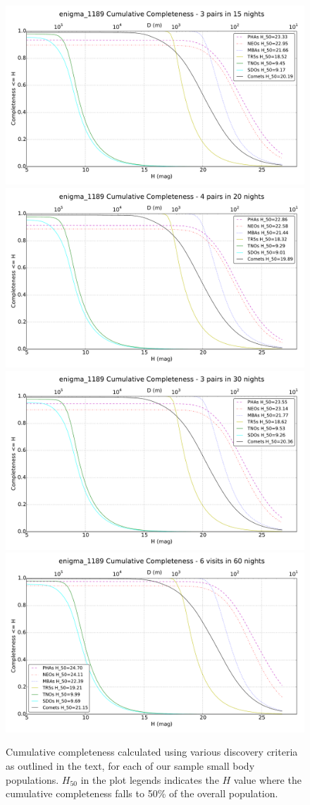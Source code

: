 \documentclass{iau}
\begin{document}
\begin{figure}[tb]
\begin{center}
\includegraphics[width=0.45\linewidth]{CumulativeCompleteness_standard}
\includegraphics[width=0.45\linewidth]{CumulativeCompleteness_four} \\
\includegraphics[width=0.45\linewidth]{CumulativeCompleteness_long}
\includegraphics[width=0.45\linewidth]{CumulativeCompleteness_magic}
\caption{Cumulative completeness calculated using various discovery
  criteria as outlined in the text, for each of our sample small body
  populations. $H_{50}$ in the plot legends indicates the $H$ value where
  the cumulative completeness falls to 50\% of the overall population.
\label{completeness}}
\end{center}
\end{figure}
\end{document}
